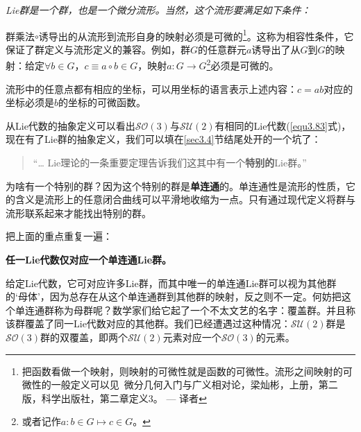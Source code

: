 {\it
Lie群是一个群，也是一个微分流形。当然，这个流形要满足如下条件：

群乘法$\circ$诱导出的从流形到流形自身的映射必须是可微的\footnote{把函数看做一个映射，则映射的可微性就是函数的可微性。流形之间映射的可微性的一般定义可以见\, 微分几何入门与广义相对论，梁灿彬，上册，第二版，科学出版社，第二章定义3。 --- 译者}。这称为相容性条件，它保证了群定义与流形定义的兼容。例如，群$G$的任意群元$a$诱导出了从$G$到$G$的映射：给定$\forall b \in G$，$c \equiv a \circ b \in G$，映射$a: G \rightarrow G$\footnote{或者记作$a: b \in G \mapsto c \in G$。}必须是可微的。

流形中的任意点都有相应的坐标，可以用坐标的语言表示上述内容：$c = ab$对应的坐标必须是$b$的坐标的可微函数。
}

从Lie代数的抽象定义可以看出$\mathcal{SO}(3)$与$\mathcal{SU}(2)$有相同的Lie代数(\ref{equ3.83}式)，现在有了Lie群的抽象定义，我们可以填在\ref{sec3.4}节结尾处开的一个坑了：

\begin{quote}
“… Lie理论的一条重要定理告诉我们这其中有一个{\bf 特别的}Lie群。”
\end{quote}

为啥有一个特别的群？因为这个特别的群是{\bf 单连通}的。单连通性是流形的性质，它的含义是流形上的任意闭合曲线可以平滑地收缩为一点。只有通过现代定义将群与流形联系起来才能找出特别的群。

把上面的重点重复一遍：

{\bf 任一Lie代数仅对应一个单连通Lie群。}

给定Lie代数，它可对应许多Lie群，而其中唯一的单连通Lie群可以视为其他群的‘母体’，因为总存在从这个单连通群到其他群的映射，反之则不一定。何妨把这个单连通群称为母群呢？数学家们给它起了一个不太文艺的名字：覆盖群。并且称该群覆盖了同一Lie代数对应的其他群。我们已经遭遇过这种情况：$\mathcal{SU}(2)$群是$\mathcal{SO}(3)$群的双覆盖，即两个$\mathcal{SU}(2)$元素对应一个$\mathcal{SO}(3)$的元素。

